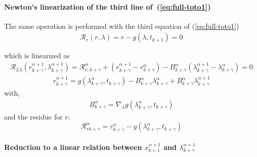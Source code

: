  \paragraph{Newton's linearization of the third  line of~(\ref{eq:full-toto1})}
The same operation is performed with the third equation of (\ref{eq:full-toto1})
\begin{equation}
  \begin{array}{l}
    \mathcal R_r(r,\lambda)=r-g(\lambda,t_{k+1}) =0\\ \\  \end{array}
\end{equation}
which is linearized as
\begin{equation}
  \label{eq:full-NL9}
  \begin{array}{l}
      \mathcal R_{L\lambda}(r^{\alpha+1}_{k+\gamma},\lambda^{\alpha+1}_{k+\gamma}) = \mathcal
      R_{r,k+\gamma}^{\alpha} + (r^{\alpha+1}_{k+\gamma} - r^{\alpha}_{k+\gamma}) - B^{\alpha}_{k+\gamma}(\lambda^{\alpha+1}_{k+\gamma} -
      \lambda^{\alpha}_{k+\gamma})=0
    \end{array}
  \end{equation}
\begin{equation}
  \label{eq:full-rrL}
  \begin{array}{l}
    \boxed{r^{\alpha+1}_{k+\gamma} = g(\lambda ^{\alpha}_{k+\gamma},t_{k+\gamma}) -B^{\alpha}_{k+\gamma}
      \lambda^{\alpha}_{k+\gamma} + B^{\alpha}_{k+\gamma} \lambda^{\alpha+1}_{k+\gamma}}       
  \end{array}
\end{equation}
with,
\begin{equation}
     \begin{array}{l}
  B^{\alpha}_{k+\gamma} = \nabla_{\lambda}g(\lambda ^{\alpha}_{k+\gamma},t_{k+\gamma})
 \end{array}
\end{equation}
and the  residue for $r$:
\begin{equation}
\boxed{\mathcal
      R_{rk+\gamma}^{\alpha} = r^{\alpha}_{k+\gamma} - g(\lambda ^{\alpha}_{k+\gamma},t_{k+\gamma})}
  \end{equation}


\paragraph{Reduction to a linear relation between  $x^{\alpha+1}_{k+1}$ and
$\lambda^{\alpha+1}_{k+\gamma}$}

